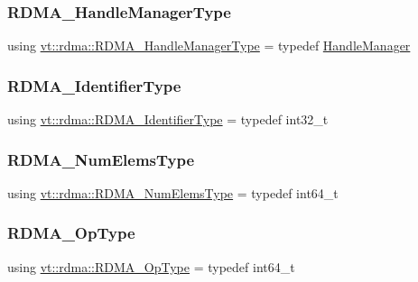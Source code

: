 \subsubsection{\texorpdfstring{R\+D\+M\+A\+\_\+\+Handle\+Manager\+Type}{RDMA\_HandleManagerType}}
{\footnotesize\ttfamily using \hyperlink{namespacevt_1_1rdma_a09c31fc860965bddd7a22f6adceb96fd}{vt\+::rdma\+::\+R\+D\+M\+A\+\_\+\+Handle\+Manager\+Type} = typedef \hyperlink{structvt_1_1rdma_1_1_handle_manager}{Handle\+Manager}}

\mbox{\label{namespacevt_1_1rdma_a3b7f2eba1e9063a37d9301061c1432f1}} 
\subsubsection{\texorpdfstring{R\+D\+M\+A\+\_\+\+Identifier\+Type}{RDMA\_IdentifierType}}
{\footnotesize\ttfamily using \hyperlink{namespacevt_1_1rdma_a3b7f2eba1e9063a37d9301061c1432f1}{vt\+::rdma\+::\+R\+D\+M\+A\+\_\+\+Identifier\+Type} = typedef int32\+\_\+t}

\mbox{\label{namespacevt_1_1rdma_aff1991e64aa5ac8d63d7dea0a82aaff3}} 
\subsubsection{\texorpdfstring{R\+D\+M\+A\+\_\+\+Num\+Elems\+Type}{RDMA\_NumElemsType}}
{\footnotesize\ttfamily using \hyperlink{namespacevt_1_1rdma_aff1991e64aa5ac8d63d7dea0a82aaff3}{vt\+::rdma\+::\+R\+D\+M\+A\+\_\+\+Num\+Elems\+Type} = typedef int64\+\_\+t}

\mbox{\label{namespacevt_1_1rdma_a9b966d9780a2b41afe7cd7b7b4b20300}} 
\subsubsection{\texorpdfstring{R\+D\+M\+A\+\_\+\+Op\+Type}{RDMA\_OpType}}
{\footnotesize\ttfamily using \hyperlink{namespacevt_1_1rdma_a9b966d9780a2b41afe7cd7b7b4b20300}{vt\+::rdma\+::\+R\+D\+M\+A\+\_\+\+Op\+Type} = typedef int64\+\_\+t}

